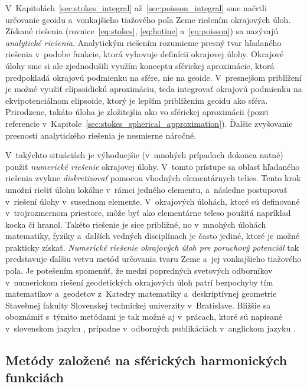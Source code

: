 \documentclass[a4paper,12pt]{book}
\begin{document}
V~Kapitolách~\ref{sec:stokes_integral} až~\ref{sec:poisson_integral} sme 
načrtli určovanie geoidu a~vonkajšieho tiažového poľa Zeme riešením okrajových 
úloh.  Získané riešenia (rovnice~\ref{eq:stokes}, \ref{eq:hotine} 
a~\ref{eq:poisson}) sa nazývajú \emph{analytické riešenia}.  Analytickým 
riešením rozumieme presný tvar hľadaného riešenia v~podobe funkcie, ktorá 
vyhovuje definícii okrajovej úlohy.  Okrajové úlohy sme si ale zjednodušili 
využím konceptu sférickej aproximácie, ktorá predpokladá okrajovú podmienku na 
sfére, nie na geoide.  V~presnejšom priblížení je možné využiť elipsoidickú 
aproximáciu, teda integrovať okrajovú podmienku na ekvipotenciálnom elipsoide, 
ktorý je lepším priblížením geoidu ako sféra.  Prirodzene, takáto úloha je 
zložitejšia ako vo sférickej aproximácii (pozri referencie 
v~Kapitole~\ref{sec:stokes_spherical_approximation}).  Ďalšie zvyšovanie 
presnosti analytického riešenia je nesmierne náročné.

V~takýchto situáciách je výhodnejšie (v~mnohých prípadoch dokonca nutné) použiť 
\emph{numerické riešenie} okrajovej úlohy.  V~tomto prístupe sa oblasť 
hľadaného riešenia zvykne \emph{diskretizovať} pomocou vhodných elementárnych 
telies.  Tento krok umožní riešiť úlohu lokálne v~rámci jedného elementu, 
a~následne postupovať v~riešení úlohy v~susednom elemente.  V~okrajových 
úlohách, ktoré sú definované v~trojrozmernom priestore, môže byť ako 
elementárne teleso použitá napríklad kocka či hranol.  Takéto riešenie je síce 
približné, no v~mnohých úlohách matematiky, fyziky a~ďalších vedných 
disciplínach je často jediné, ktoré je možné prakticky získať.  \emph{Numerické 
riešenie okrajových úloh pre poruchový potenciál} tak predstavuje ďalšiu vetvu 
metód určovania tvaru Zeme a~jej vonkajšieho tiažového poľa.  Je potešením 
spomenúť, že medzi popredných svetových odborníkov v~numerickom riešení 
geodetických okrajových úloh patrí bezpochyby tím matematikov a~geodetov 
z~Katedry matematiky a~deskriptívnej geometrie Stavebnej fakulty Slovenskej 
technickej univerzity v~Bratislave.  Bližšie sa oboznámiť s~týmito metódami je 
tak možné aj v~prácach, ktoré sú napísané v~slovenskom jazyku 
\parencite[napríklad][]{Janak2006,Macak2021}, prípadne v~odborných publikáciách 
v~anglickom jazyku 
\parencite[napríklad][]{Cunderlik2008,Faskova2010,Macak2014}.


\subsection{Metódy založené na sférických harmonických funkciách}
\end{document}
